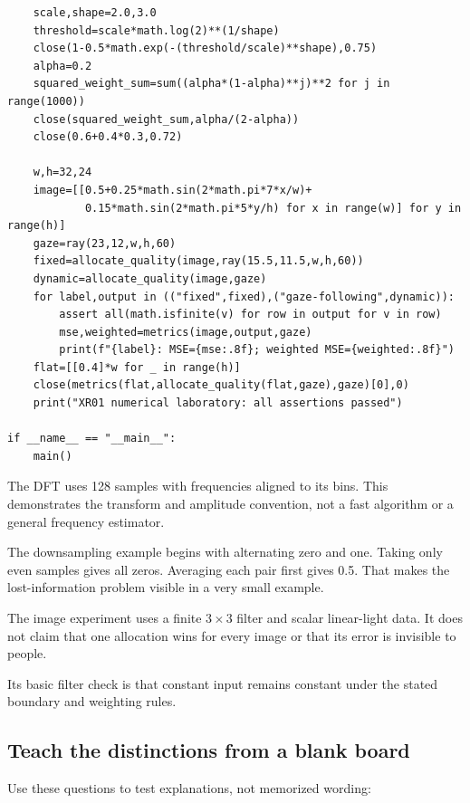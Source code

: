 \begin{verbatim}
    scale,shape=2.0,3.0
    threshold=scale*math.log(2)**(1/shape)
    close(1-0.5*math.exp(-(threshold/scale)**shape),0.75)
    alpha=0.2
    squared_weight_sum=sum((alpha*(1-alpha)**j)**2 for j in range(1000))
    close(squared_weight_sum,alpha/(2-alpha))
    close(0.6+0.4*0.3,0.72)

    w,h=32,24
    image=[[0.5+0.25*math.sin(2*math.pi*7*x/w)+
            0.15*math.sin(2*math.pi*5*y/h) for x in range(w)] for y in range(h)]
    gaze=ray(23,12,w,h,60)
    fixed=allocate_quality(image,ray(15.5,11.5,w,h,60))
    dynamic=allocate_quality(image,gaze)
    for label,output in (("fixed",fixed),("gaze-following",dynamic)):
        assert all(math.isfinite(v) for row in output for v in row)
        mse,weighted=metrics(image,output,gaze)
        print(f"{label}: MSE={mse:.8f}; weighted MSE={weighted:.8f}")
    flat=[[0.4]*w for _ in range(h)]
    close(metrics(flat,allocate_quality(flat,gaze),gaze)[0],0)
    print("XR01 numerical laboratory: all assertions passed")

if __name__ == "__main__":
    main()
\end{verbatim}

The DFT uses 128 samples with frequencies aligned to its bins. This demonstrates the transform and amplitude convention, not a fast algorithm or a general frequency estimator.

The downsampling example begins with alternating zero and one. Taking only even samples gives all zeros. Averaging each pair first gives 0.5. That makes the lost-information problem visible in a very small example.

The image experiment uses a finite \(3\times3\) filter and scalar linear-light data. It does not claim that one allocation wins for every image or that its error is invisible to people.

Its basic filter check is that constant input remains constant under the stated boundary and weighting rules.

\subsection{Teach the distinctions from a blank board}\label{04-visual-computing-ii-ch043-teach-the-distinctions-from-a-blank-board}

Use these questions to test explanations, not memorized wording:

